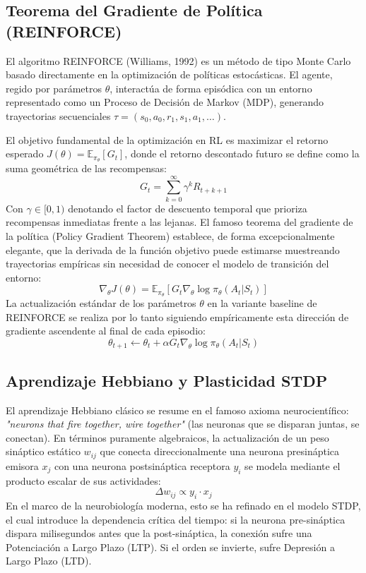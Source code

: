 \documentclass[a4paper,12pt,twocolumn]{article}
\begin{document}
\subsection{Teorema del Gradiente de Política (REINFORCE)}
El algoritmo REINFORCE (Williams, 1992) es un método de tipo Monte Carlo basado directamente en la optimización de políticas estocásticas. El agente, regido por parámetros $\theta$, interactúa de forma episódica con un entorno representado como un Proceso de Decisión de Markov (MDP), generando trayectorias secuenciales $\tau = (s_0, a_0, r_1, s_1, a_1, \dots)$. 

El objetivo fundamental de la optimización en RL es maximizar el retorno esperado $J(\theta) = \mathbb{E}_{\pi_\theta}[G_t]$, donde el retorno descontado futuro se define como la suma geométrica de las recompensas:
\begin{equation}
    G_t = \sum_{k=0}^{\infty} \gamma^k R_{t+k+1}
\end{equation}
Con $\gamma \in [0,1)$ denotando el factor de descuento temporal que prioriza recompensas inmediatas frente a las lejanas. El famoso teorema del gradiente de la política (Policy Gradient Theorem) establece, de forma excepcionalmente elegante, que la derivada de la función objetivo puede estimarse muestreando trayectorias empíricas sin necesidad de conocer el modelo de transición del entorno:
\begin{equation}
    \nabla_\theta J(\theta) = \mathbb{E}_{\pi_\theta} \left[ G_t \nabla_\theta \log \pi_\theta(A_t | S_t) \right]
\end{equation}
La actualización estándar de los parámetros $\theta$ en la variante baseline de REINFORCE se realiza por lo tanto siguiendo empíricamente esta dirección de gradiente ascendente al final de cada episodio:
\begin{equation}
    \theta_{t+1} \leftarrow \theta_t + \alpha G_t \nabla_\theta \log \pi_\theta(A_t | S_t)
\end{equation}

\subsection{Aprendizaje Hebbiano y Plasticidad STDP}
El aprendizaje Hebbiano clásico se resume en el famoso axioma neurocientífico: \textit{"neurons that fire together, wire together"} (las neuronas que se disparan juntas, se conectan). En términos puramente algebraicos, la actualización de un peso sináptico estático $w_{ij}$ que conecta direccionalmente una neurona presináptica emisora $x_j$ con una neurona postsináptica receptora $y_i$ se modela mediante el producto escalar de sus actividades:
\begin{equation}
    \Delta w_{ij} \propto y_i \cdot x_j
\end{equation}
En el marco de la neurobiología moderna, esto se ha refinado en el modelo STDP, el cual introduce la dependencia crítica del tiempo: si la neurona pre-sináptica dispara milisegundos antes que la post-sináptica, la conexión sufre una Potenciación a Largo Plazo (LTP). Si el orden se invierte, sufre Depresión a Largo Plazo (LTD).
\end{document}
